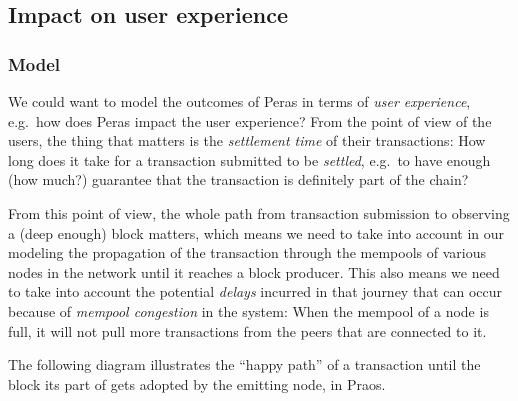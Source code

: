 \documentclass[10pt]{article}
\begin{document}
\subsection{Impact on user experience}\label{impact-on-user-experience}

\subsubsection{Model}\label{model}

We could want to model the outcomes of Peras in terms of \emph{user
experience}, e.g.~how does Peras impact the user experience? From the
point of view of the users, the thing that matters is the
\emph{settlement time} of their transactions: How long does it take for
a transaction submitted to be \emph{settled}, e.g.~to have enough (how
much?) guarantee that the transaction is definitely part of the chain?

From this point of view, the whole path from transaction submission to
observing a (deep enough) block matters, which means we need to take
into account in our modeling the propagation of the transaction through
the mempools of various nodes in the network until it reaches a block
producer. This also means we need to take into account the potential
\emph{delays} incurred in that journey that can occur because of
\emph{mempool congestion} in the system: When the mempool of a node is
full, it will not pull more transactions from the peers that are
connected to it.

The following diagram illustrates the ``happy path'' of a transaction
until the block its part of gets adopted by the emitting node, in Praos.
\end{document}
